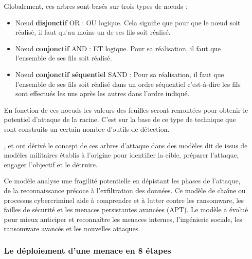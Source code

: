 Globalement, ces arbres sont basés sur trois types de nœuds :

\begin{itemize}
  \item Nœud \textbf{disjonctif} OR : OU logique. Cela signifie que pour que le nœud soit réalisé, il faut qu’au moins un de ses fils soit réalisé.
  \item Nœud \textbf{conjonctif} AND : ET logique. Pour sa réalisation, il faut que l’ensemble de ses fils soit réalisé.
  \item Nœud \textbf{conjonctif séquentiel }SAND : Pour sa réalisation, il faut que l'ensemble de ses fils soit réalisé dans un ordre séquentiel c'est-à-dire les fils sont effectués les uns après les autres dans l’ordre indiqué.
\end{itemize}

En fonction de ces noeuds les valeurs des feuilles seront remontées pour obtenir le potentiel d'attaque de la racine.
C'est sur la base de ce type de technique que sont construits un certain nombre d'outils de détection.
 

, et  ont dérivé le concept de ces arbres d'attaque dans des modèles dit de  issus de modèles militaires établis à l’origine pour identifier la cible, préparer l’attaque, engager l’objectif et le détruire.

Ce modèle analyse une fragilité potentielle en dépistant les phases de l’attaque, de la reconnaissance précoce à l’exfiltration des données. Ce modèle de chaîne ou processus cybercriminel aide à comprendre et à lutter contre les ransomware, les failles de sécurité et les menaces persistantes avancées (APT). Le modèle a évolué pour mieux anticiper et reconnaître les menaces internes, l’ingénierie sociale, les ransomware avancés et les nouvelles attaques.

\subsubsection{Le déploiement d'une menace en 8 étapes}


